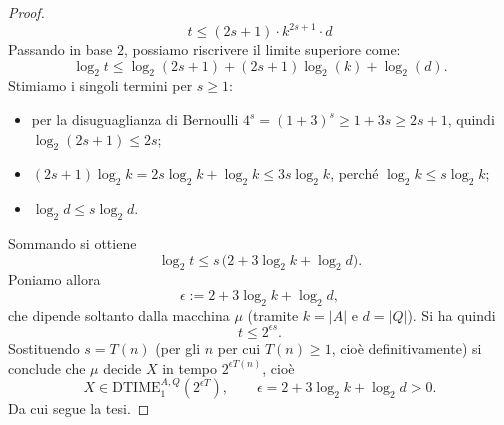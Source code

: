 \begin{proof}
    \[
    t \leq (2s+1) \cdot k^{2s+1} \cdot d
    \]
     Passando in base $2$, possiamo riscrivere il limite superiore come:
    \[
    \log_2 t \leq \log_2(2s+1) + (2s+1)\log_2(k) + \log_2(d).
    \]
    Stimiamo i singoli termini per $s\ge 1$:
    \begin{itemize}
        \item per la disuguaglianza di Bernoulli $4^s=(1+3)^s\ge 1+3s\ge 2s+1$, quindi $\log_2(2s+1)\le 2s$;
        \item $(2s+1)\log_2 k=2s\log_2 k+\log_2 k\le 3s\log_2 k$, perché $\log_2 k\le s\log_2 k$;
        \item $\log_2 d\le s\log_2 d$.
    \end{itemize}
    Sommando si ottiene
    \[
    \log_2 t\le s\,\bigl(2+3\log_2 k+\log_2 d\bigr).
    \]
    Poniamo allora
    \[
    \epsilon:=2+3\log_2 k+\log_2 d,
    \]
    che dipende soltanto dalla macchina $\mu$ (tramite $k=|A|$ e $d=|Q|$). Si ha quindi
    \[
    t\le 2^{\epsilon s}.
    \]
    Sostituendo $s=T(n)$ (per gli $n$ per cui $T(n)\ge 1$, cioè definitivamente) si conclude che $\mu$ decide $X$ in tempo $2^{\epsilon T(n)}$, cioè
    \[
    X\in\mathrm{DTIME}_1^{A,Q}(2^{\epsilon T}),\qquad \epsilon=2+3\log_2 k+\log_2 d>0.
    \]
    Da cui segue la tesi.
\end{proof}


